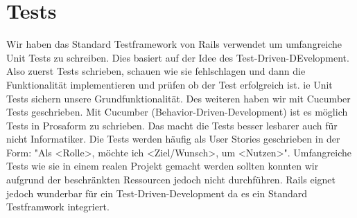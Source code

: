 \section{Tests}
Wir haben das Standard Testframework von Rails verwendet um umfangreiche Unit Tests zu schreiben. Dies basiert auf der Idee des Test-Driven-DEvelopment. Also zuerst Tests schrieben, schauen wie sie fehlschlagen und dann die Funktionalität implementieren und prüfen ob der Test erfolgreich ist. ie Unit Tests sichern unsere Grundfunktionalität. Des weiteren haben wir mit Cucumber Tests geschrieben. Mit Cucumber (Behavior-Driven-Development) ist es möglich Tests in Prosaform zu schrieben. Das macht die Tests besser lesbarer auch für nicht Informatiker. Die Tests werden häufig als User Stories geschrieben in der Form: "Als <Rolle>, möchte ich <Ziel/Wunsch>, um <Nutzen>". Umfangreiche Tests wie sie in einem realen Projekt gemacht werden sollten konnten wir aufgrund der beschränkten Ressourcen jedoch nicht durchführen. Rails eignet jedoch wunderbar für ein Test-Driven-Development da es ein Standard Testframwork integriert. 